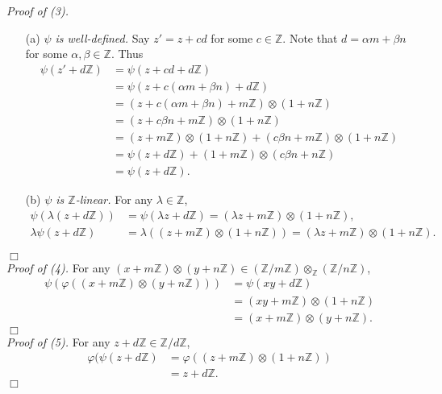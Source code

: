\documentclass{article}
\begin{document}
\emph{Proof of (3).}
\begin{enumerate}
\item[(a)]
\emph{$\psi$ is well-defined.}
Say $z' = z + cd$ for some $c \in \mathbb{Z}$.
Note that $d = \alpha m + \beta n$ for some $\alpha, \beta \in \mathbb{Z}$.
Thus
\begin{align*}
  \psi(z' + d\mathbb{Z})
  &= \psi(z + cd + d\mathbb{Z}) \\
  &= \psi(z + c(\alpha m + \beta n) + d\mathbb{Z}) \\
  &= (z + c(\alpha m + \beta n) + m\mathbb{Z}) \otimes (1 + n\mathbb{Z}) \\
  &= (z + c \beta n + m\mathbb{Z}) \otimes (1 + n\mathbb{Z}) \\
  &= (z + m\mathbb{Z}) \otimes (1 + n\mathbb{Z})
  + (c \beta n + m\mathbb{Z}) \otimes (1 + n\mathbb{Z}) \\
  &= \psi(z + d\mathbb{Z})
  + (1 + m\mathbb{Z}) \otimes (c \beta n + n\mathbb{Z}) \\
  &= \psi(z + d\mathbb{Z}).
\end{align*}
\item[(b)]
\emph{$\psi$ is $\mathbb{Z}$-linear.} For any $\lambda \in \mathbb{Z}$,
\begin{align*}
  \psi(\lambda(z + d\mathbb{Z}))
  &= \psi(\lambda z + d\mathbb{Z})
  = (\lambda z + m\mathbb{Z}) \otimes (1 + n\mathbb{Z}), \\
  \lambda \psi(z + d\mathbb{Z})
  &= \lambda((z + m\mathbb{Z}) \otimes (1 + n\mathbb{Z}))
  = (\lambda z + m\mathbb{Z}) \otimes (1 + n\mathbb{Z}).
\end{align*}
\end{enumerate}
$\Box$ \\

\emph{Proof of (4).}
For any $(x + m\mathbb{Z}) \otimes (y + n\mathbb{Z}) \in
(\mathbb{Z}/m\mathbb{Z}) \otimes_{\mathbb{Z}} (\mathbb{Z}/n\mathbb{Z})$,
\begin{align*}
  \psi(\varphi((x + m\mathbb{Z}) \otimes (y + n\mathbb{Z})))
  &= \psi(xy + d\mathbb{Z}) \\
  &= (xy + m\mathbb{Z}) \otimes (1 + n\mathbb{Z}) \\
  &= (x + m\mathbb{Z}) \otimes (y + n\mathbb{Z}).
\end{align*}
$\Box$ \\

\emph{Proof of (5).}
For any $z + d\mathbb{Z} \in \mathbb{Z}/d\mathbb{Z}$,
\begin{align*}
  \varphi(\psi(z + d\mathbb{Z})
  &= \varphi((z + m\mathbb{Z}) \otimes (1 + n\mathbb{Z})) \\
  &= z + d\mathbb{Z}.
\end{align*}
$\Box$ \\\\
\end{document}
